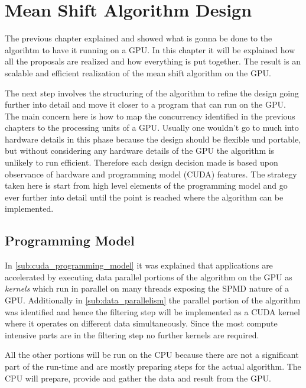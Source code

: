 
\chapter{Mean Shift Algorithm Design} %
\label{cha:algorithm_design}
The previous chapter explained and showed what is gonna be done to the algorihtm
to have it running on a \gls{GPU}. In this chapter it will be explained how all
the proposals are realized and how everything is put together. The result is an
scalable and efficient realization of the mean shift algorithm on the \gls{GPU}.

The next step involves the structuring of the algorithm to refine the design
going further into detail and move it closer to a program that can run on the
\gls{GPU}. The main concern here is how to map the concurrency identified in the
previous chapters to the processing units of a \gls{GPU}. Usually one wouldn't
go to much into hardware details in this phase because the design should be
flexible und portable, but without considering any hardware details of the
\gls{GPU} the algorithm is unlikely to run efficient. Therefore each design
decision made is based upon observance of hardware and programming model
(\gls{CUDA}) features. The strategy taken here is start from high level elements
of the programming model and go ever further into detail until the point is reached
where the algorithm can be implemented. 

\section{Programming Model} %
\label{sec:cuda_kernels}

In \autoref{sub:cuda_programming_model} it was explained that applications are
accelerated by executing data parallel portions of the algorithm on the
\gls{GPU} as \emph{kernels} which run in parallel on many threads exposing the
\gls{SPMD} nature of a \gls{GPU}. Additionally in \autoref{sub:data_parallelism}
the parallel portion of the algorithm was identified and hence the filtering
step will be implemented as a \gls{CUDA} kernel where it operates on different
data simultaneously. Since the most compute intensive parts are in the filtering
step no further kernels are required. 

All the other portions will be run on the \gls{CPU} because there are not a
significant part of the run-time and are mostly preparing steps for the actual
algorithm. The \gls{CPU} will prepare, provide and gather the data and result 
from the \gls{GPU}. 

